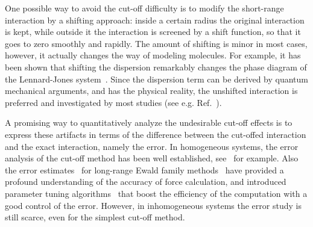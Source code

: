 \documentclass[aps, pre, preprint]{revtex4}
\begin{document}
{ One possible way to avoid the cut-off difficulty is to
  modify the short-range interaction by a shifting approach: inside a
  certain radius the original interaction is kept, while outside it the
  interaction is screened by a shift function, so that it goes to
  zero smoothly and rapidly. The amount of shifting is minor in most cases,
  however, it actually changes the way of
  modeling molecules. For example, it
  has been shown that shifting the dispersion remarkably changes the
  phase diagram of the Lennard-Jones system~\cite{smit1992phase}.
  Since the dispersion term 
  can be derived by quantum mechanical arguments, and has the physical
  reality, the unshifted interaction is
  preferred and investigated by most studies
  (see e.g. Ref.~\cite{potoff1998critical, perez2006critical}).
}


A promising way to quantitatively analyze the undesirable cut-off
effects is to express these artifacts in terms of the difference
between the cut-offed interaction and the exact interaction, namely
the error. In homogeneous systems, the error analysis of the cut-off
method has been well established, see~\cite{kolafa1992cutoff, wang2011} for
example. Also the error estimates~\cite{hummer1995numerical,
  kolafa1992cutoff, petersen1995accuracy, deserno1998mue2,
  wang2010optimizing} for long-range Ewald family
methods~\cite{ewald1921die, hockney1988computer, 
  darden1993pme, essmann1995spm, deserno1998mue1} have provided a profound
understanding of the accuracy of force calculation, and introduced
parameter tuning algorithms~\cite{limbach06a, wang2010optimizing} that
boost the efficiency of the computation with a good control of the
error. However, in inhomogeneous systems the error study is still
scarce, even for the simplest cut-off method.
\end{document}
